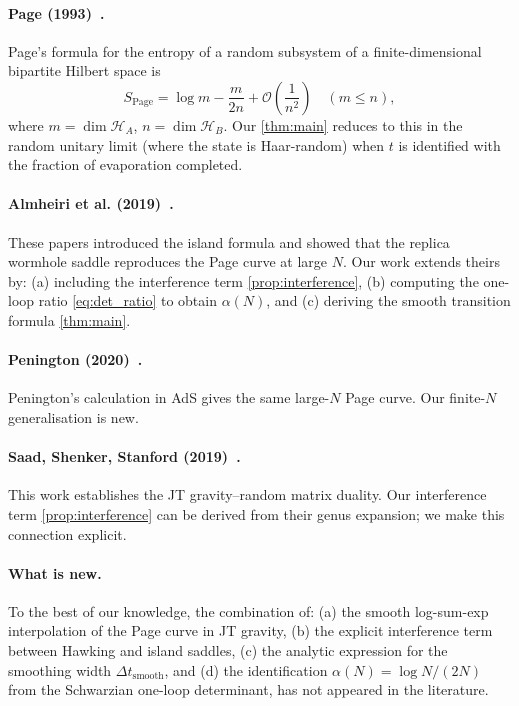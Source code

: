 \documentclass[12pt,a4paper]{article}
\newcommand{\OO}{\mathcal{O}}
\begin{document}
\paragraph{Page (1993)~\citep{Page1993a,Page1993b}.}
Page's formula for the entropy of a random subsystem of a finite-dimensional
bipartite Hilbert space is
\begin{equation}
  S_{\mathrm{Page}} = \log m - \frac{m}{2n}
    + \OO\!\left(\frac{1}{n^2}\right)
    \quad (m \le n),
\label{eq:page_formula}
\end{equation}
where $m = \dim\mathcal{H}_A$, $n = \dim\mathcal{H}_B$.  Our
\cref{thm:main} reduces to this in the random unitary limit (where the
state is Haar-random) when $t$ is identified with the fraction of
evaporation completed.

\paragraph{Almheiri et al. (2019)~\citep{Almheiri2019a,Almheiri2019b}.}
These papers introduced the island formula and showed that the replica
wormhole saddle reproduces the Page curve at large $N$.  Our work extends
theirs by:
(a) including the interference term \cref{prop:interference},
(b) computing the one-loop ratio \cref{eq:det_ratio} to obtain $\alpha(N)$,
and (c) deriving the smooth transition formula \cref{thm:main}.

\paragraph{Penington (2020)~\citep{Penington2020}.}
Penington's calculation in AdS gives the same large-$N$ Page curve.
Our finite-$N$ generalisation is new.

\paragraph{Saad, Shenker, Stanford (2019)~\citep{Saad2019}.}
This work establishes the JT gravity--random matrix duality.  Our
interference term \cref{prop:interference} can be derived from their
genus expansion; we make this connection explicit.

\paragraph{What is new.}
To the best of our knowledge, the combination of:
(a) the smooth log-sum-exp interpolation of the Page curve in JT gravity,
(b) the explicit interference term between Hawking and island saddles,
(c) the analytic expression for the smoothing width $\Delta t_{\mathrm{smooth}}$,
and (d) the identification $\alpha(N) = \log N/(2N)$ from the Schwarzian
one-loop determinant,
has not appeared in the literature.
\end{document}

